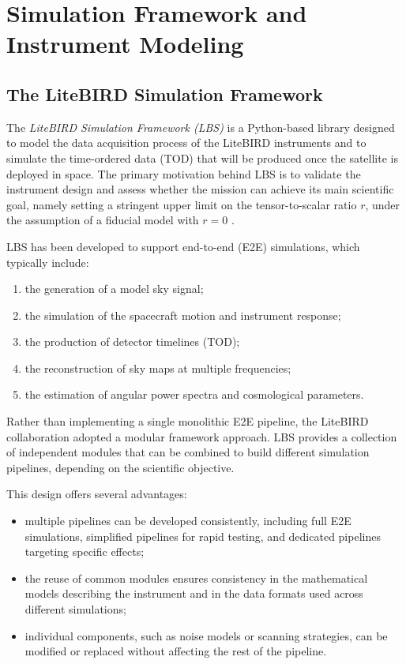 \chapter{Simulation Framework and Instrument Modeling}


\section{The LiteBIRD Simulation Framework}

The \textit{LiteBIRD Simulation Framework (LBS)} is a Python-based library designed to model the data acquisition process of the LiteBIRD instruments and to simulate the time-ordered data (TOD) that will be produced once the satellite is deployed in space. The primary motivation behind LBS is to validate the instrument design and assess whether the mission can achieve its main scientific goal, namely setting a stringent upper limit on the tensor-to-scalar ratio $r$, under the assumption of a fiducial model with $r = 0$ \cite{Tomasi2025}.

LBS has been developed to support end-to-end (E2E) simulations, which typically include:
\begin{enumerate}
    \item the generation of a model sky signal;
    \item the simulation of the spacecraft motion and instrument response;
    \item the production of detector timelines (TOD);
    \item the reconstruction of sky maps at multiple frequencies;
    \item the estimation of angular power spectra and cosmological parameters.
\end{enumerate}

Rather than implementing a single monolithic E2E pipeline, the LiteBIRD collaboration adopted a modular framework approach. LBS provides a collection of independent modules that can be combined to build different simulation pipelines, depending on the scientific objective.

This design offers several advantages:
\begin{itemize}
    \item multiple pipelines can be developed consistently, including full E2E simulations, simplified pipelines for rapid testing, and dedicated pipelines targeting specific effects;
    \item the reuse of common modules ensures consistency in the mathematical models describing the instrument and in the data formats used across different simulations;
    \item individual components, such as noise models or scanning strategies, can be modified or replaced without affecting the rest of the pipeline.
\end{itemize}

